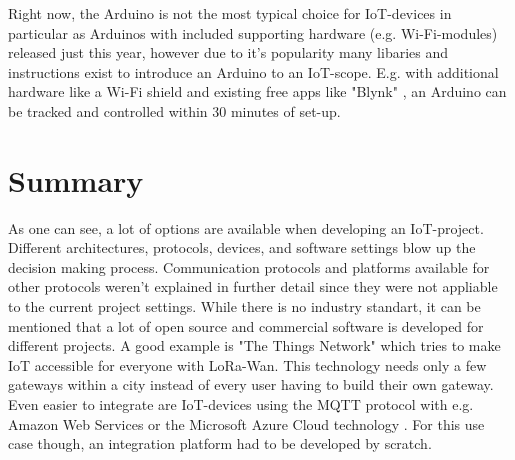 Right now, the Arduino is not the most typical choice for IoT-devices in particular as Arduinos 
with included supporting hardware (e.g. Wi-Fi-modules) released just this year,
however due to it's popularity many libaries and instructions exist to introduce an Arduino to an IoT-scope.
E.g. with additional hardware like a Wi-Fi shield and existing free apps like "Blynk"  \parencite{blynk}, 
an Arduino can be tracked and controlled within 30 minutes of set-up.

\section{Summary}
As one can see, a lot of options are available when developing an IoT-project.
Different architectures, protocols, devices, and software settings blow up the decision making process.
Communication protocols and platforms available for other protocols weren't explained in further detail since they were not appliable to the current project settings.
While there is no industry standart, it can be mentioned that a lot of open source and commercial software is developed for different projects.
A good example is "The Things Network" \parencite{ttn} which tries to make IoT accessible for everyone with LoRa-Wan.
This technology needs only a few gateways within a city instead of every user having to build their own gateway.
Even easier to integrate are IoT-devices using the MQTT protocol with e.g. Amazon Web Services \parencite{awsIOT} or the Microsoft Azure Cloud technology \parencite{msIOT}.
For this use case though, an integration platform had to be developed by scratch.

